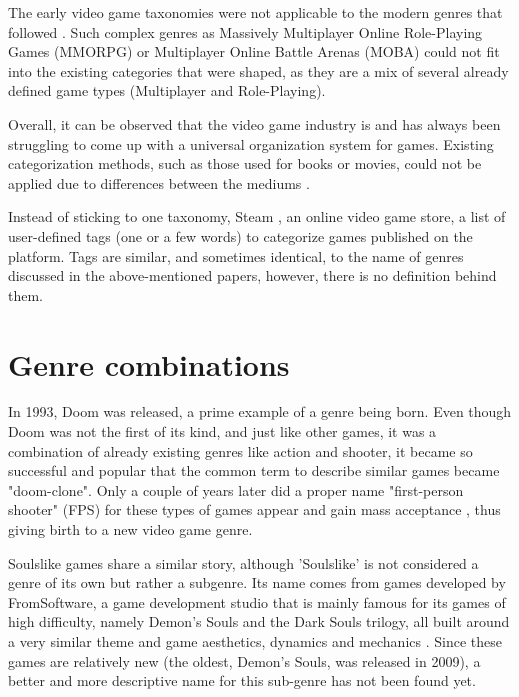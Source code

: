 The early video game taxonomies were not applicable to the modern genres that followed \cite{starosta2024tangled}. Such complex genres as Massively Multiplayer Online Role-Playing Games (MMORPG) or Multiplayer Online Battle Arenas (MOBA) could not fit into the existing categories that were shaped, as they are a mix of several already defined game types (Multiplayer and Role-Playing).

Overall, it can be observed that the video game industry is and has always been struggling to come up with a universal organization system for games. Existing categorization methods, such as those used for books or movies, could not be applied due to differences between the mediums \cite{lee2014facet}.

Instead of sticking to one taxonomy, Steam \cite{steam}, an online video game store,  a list of user-defined tags (one or a few words) to categorize games published on the platform. Tags are similar, and sometimes identical, to the name of genres discussed in the above-mentioned papers, however, there is no definition behind them. %



\section{Genre combinations}

In 1993, Doom \cite{doom1993} was released, a prime example of a genre being born. Even though Doom was not the first of its kind, and just like other games, it was a combination of already existing genres like action and shooter, it became so successful and popular that the common term to describe similar games became "doom-clone". Only a couple of years later did a proper name "first-person shooter" (FPS) for these types of games appear and gain mass acceptance \cite{arsenault2009}, thus giving birth to a new video game genre.

Soulslike games share a similar story, although 'Soulslike' is not considered a genre of its own but rather a subgenre. Its name comes from games developed by FromSoftware, a game development studio that is mainly famous for its games of high difficulty, namely Demon's Souls and the Dark Souls trilogy, all built around a very similar theme and game aesthetics, dynamics and mechanics \cite{hunicke2004mda}. Since these games are relatively new (the oldest, Demon's Souls, was released in 2009), a better and more descriptive name for this sub-genre has not been found yet.



